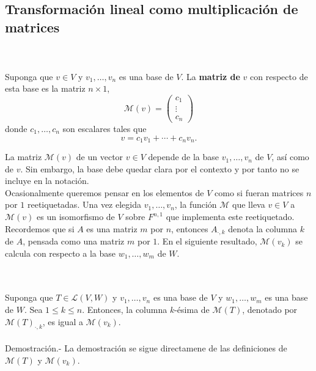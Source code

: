 \subsection{Transformación lineal como multiplicación de matrices}

\begin{mydef}\;\\\\
    Suponga que $v\in V$ y $v_1,\ldots,v_n$ es una base de $V$. La \textbf{matriz de} $v$ con respecto de esta base es la matriz $n\times 1$,
    $$\mathcal{M}(v)=
	\begin{pmatrix}
	    c_1\\
	    \vdots\\
	    c_n
	\end{pmatrix}
    $$
    donde $c_1,\ldots,c_n$ son escalares tales que
    $$v=c_1v_1+\cdots+c_nv_n.$$
\end{mydef}

La matriz $\mathcal{M}(v)$ de un vector $v\in V$ depende de la base $v_1,\ldots,v_n$ de $V$, así como de $v$. Sin embargo, la base debe quedar clara por el contexto y por tanto no se incluye en la notación.\\

Ocasionalmente queremos pensar en los elementos de $V$ como si fueran matrices $n$ por $1$ reetiquetadas. Una vez elegida $v_1,\ldots,v_n$, la función $\mathcal{M}$ que lleva $v\in V$ a $\mathcal{M}(v)$ es un isomorfismo de $V$ sobre $F^{n,1}$ que implementa este reetiquetado.\\

Recordemos que si $A$ es una matriz $m$ por $n$, entonces $A_{\cdot,k}$ denota la columna $k$ de $A$, pensada como una matriz $m$ por $1$. En el siguiente resultado, $\mathcal{M}(v_k)$ se calcula con respecto a la base $w_1, \ldots, w_m$ de $W$.

\setcounter{myteo}{63}
\begin{myteo}[\boldmath $\mathcal{M}(T)_{\cdot,k}=\mathcal{M}(v_k)$]\,\\\\
    Suponga que $T\in \mathcal{L}(V,W)$ y $v_1,\ldots,v_n$ es una base de $V$ y $w_1,\ldots,w_m$ es una base de $W$. Sea $1\leq k\leq n$. Entonces, la columna $k$-ésima de $\mathcal{M}(T)$, denotado por $\mathcal{M}(T)_{\cdot,k}$, es igual a $\mathcal{M}(v_k)$.\\\\
	Demostración.-\; La demostración se sigue directamene de las definiciones de $\mathcal{M}(T)$ y $\mathcal{M}(v_k)$.
\end{myteo}

